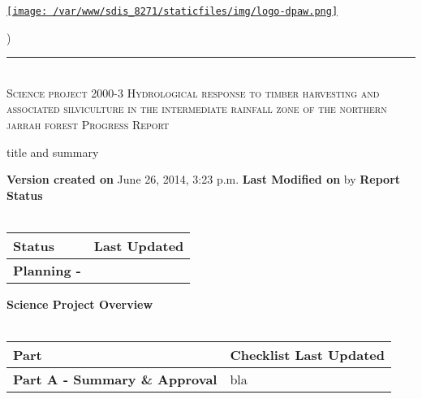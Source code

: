 \documentclass[version=last, paper=a4, DIV=18, usenames, dvipsnames]{scrartcl}
\newcommand{\HRule}{\rule{\linewidth}{0.1pt}}
\begin{document}
\setcounter{secnumdepth}{-1}


\begin{titlepage}
\begin{center}
\begin{minipage}[t]{0.28\textwidth}
\begin{flushleft}
\href{http://www.dpaw.wa.gov.au}{\texttt{[image: /var/www/sdis\_8271/staticfiles/img/logo-dpaw.png]}}
\end{flushleft}
\end{minipage}
\begin{minipage}[b]{0.7\textwidth}
\begin{flushright}
    \href{http://sdis.dpaw.wa.gov.au/documents/progressreport/1223/download/}{}) \\
\end{flushright}
\end{minipage}
\HRule \\[0.4cm]
\vfill
\textsc{\Huge Science project 2000-3 Hydrological response to timber harvesting and associated silviculture in the intermediate rainfall zone of the northern jarrah forest \newline }
\vfill
\textsc{\Huge Progress Report}

\vfill\vfill\vfill\vfill
title and summary

\vfill\vfill\vfill\vfill\vfill\vfill\vfill\vfill

\textbf{Version created on} June 26, 2014, 3:23 p.m.
\vfill
\textbf{Last Modified on}  by 
\vfill\vfill
\textbf{Report Status}\\\,
\begin{tabu} to \linewidth { | X[l] | X | }
\hline
{}
Status & Last Updated \\
\hline
\textbf{Planning - } \\
\hline
\end{tabu}
\vfill
\textbf{Science Project Overview}\\\,
\begin{tabu} to \linewidth { | X[l] | X | }
\hline
{}
Part & Checklist Last Updated \\
\hline
\textbf{Part A - Summary \& Approval} & bla \\
\hline
\end{tabu}

\end{center}
\end{titlepage}

\setcounter{tocdepth}{2}
\tableofcontents
\clearpage
\end{document}
